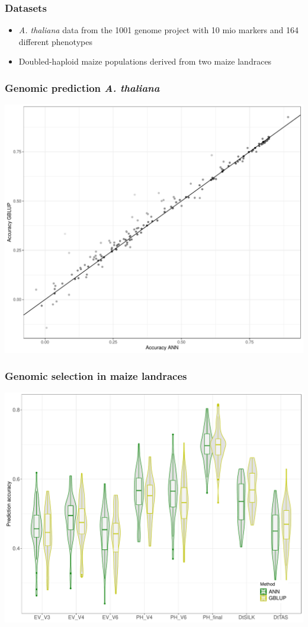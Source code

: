 \documentclass{beamer}
\begin{document}
\begin{frame}
  \frametitle{Datasets}
  \begin{itemize}[<+->]
  \item \textit{A. thaliana} data from the 1001 genome project with 10 mio markers and 164 different phenotypes
  \item Doubled-haploid maize populations derived from two maize landraces
  \end{itemize}
\end{frame}


\begin{frame}
  \frametitle{Genomic prediction \textit{A. thaliana}}
  \includegraphics[height=.8\textheight,width=.9\textwidth]{ann_vs_gblup}
\end{frame}

\begin{frame}
  \frametitle{Genomic selection in maize landraces}
  \includegraphics[height=.8\textheight,width=.9\textwidth]{gp_kemater}
\end{frame}
\end{document}
